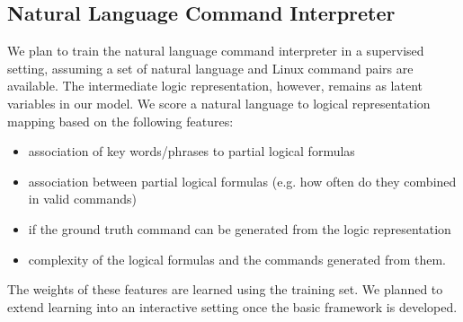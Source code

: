\subsection{Natural Language Command Interpreter}
We plan to train the natural language command interpreter in a supervised setting, assuming a set of natural language and Linux command pairs are available. The intermediate logic representation, however, remains as latent variables in our model. We score a natural language to logical representation mapping based on the following features:
\begin{itemize}\itemsep-1pt
	\item association of key words/phrases to partial logical formulas
	\item association between partial logical formulas (e.g. how often do they combined in valid commands)
	\item if the ground truth command can be generated from the logic representation
	\item complexity of the logical formulas and the commands generated from them.
\end{itemize}
The weights of these features are learned using the training set. We planned to extend learning into an interactive setting once the basic framework is developed.